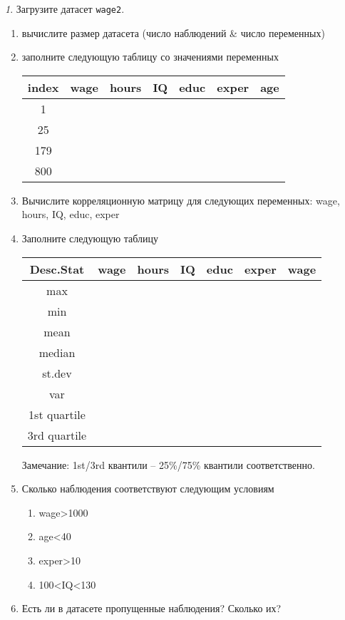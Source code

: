 \documentclass[12pt]{article}
\theoremstyle{remark}
\newtheorem{exercise}{}[section]
\begin{document}
\begin{exercise}
Загрузите датасет \texttt{wage2}.
\begin{enumerate}
	\item вычислите размер датасета (число наблюдений \& число переменных)
	\item заполните следующую таблицу со значениями переменных
	\begin{center}
		\begin{tabular}{|c|c|c|c|c|c|c|} \hline
			index & wage & hours& IQ & educ & exper & age \\ \hline\hline
			1 & & & & & & \\ \hline
			25 & & & &  & & \\ \hline
			179 & & & & & & \\ \hline
			800 & & & & & & \\ \hline
		\end{tabular}
	\end{center}
	\item Вычислите корреляционную матрицу для следующих переменных: wage, hours, IQ, educ, exper 
	\item Заполните следующую таблицу
	\begin{center}
		\begin{tabular}{|c|c|c|c|c|c|c|} \hline
			Desc.Stat & wage & hours& IQ & educ & exper & wage \\ \hline\hline
			max & & & & & & \\ \hline
			min & & & & & & \\ \hline
			mean & & & & & & \\ \hline
			median & & & & & & \\ \hline
			st.dev & & & & & & \\ \hline
			var & & & & & & \\ \hline
			1st quartile & & & & & & \\ \hline
			3rd quartile & & & & & & \\ \hline
		\end{tabular}
	\end{center}
	Замечание: 1st/3rd квантили -- 25\%/75\% квантили соответственно.
	\item Сколько наблюдения соответствуют следующим условиям
		\begin{enumerate}
			\item wage>1000
			\item age<40
			\item exper>10
			\item 100<IQ<130
		\end{enumerate}
	\item Есть ли в датасете пропущенные наблюдения?
	Сколько их?
\end{enumerate}
\end{exercise}
\end{document}
